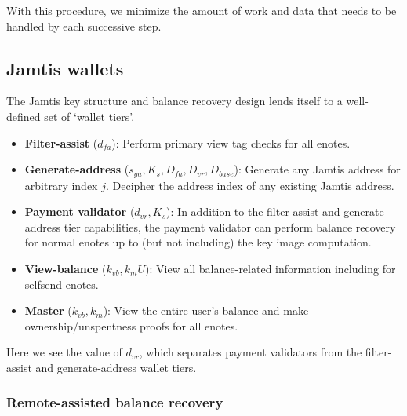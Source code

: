 With this procedure, we minimize the amount of work and data that needs to be handled by each successive step.


\subsection{Jamtis wallets}
\label{subsec:jamtis-wallets}

The Jamtis key structure and balance recovery design lends itself to a well-defined set of `wallet tiers'.

\begin{itemize}
    \item \textbf{Filter-assist} ($d_{fa}$): Perform primary view tag checks for all enotes.

    \item \textbf{Generate-address} ($s_{ga}, K_s, D_{fa}, D_{vr}, D_{base}$): Generate any Jamtis address for arbitrary index $j$. Decipher the address index of any existing Jamtis address.

    \item \textbf{Payment validator} ($d_{vr}, K_s$): In addition to the filter-assist and generate-address tier capabilities, the payment validator can perform balance recovery for normal enotes up to (but not including) the key image computation.

    \item \textbf{View-balance} ($k_{vb}, k_m U$): View all balance-related information including for selfsend enotes.

    \item \textbf{Master} ($k_{vb}, k_m$): View the entire user's balance and make ownership/unspentness proofs for all enotes.
\end{itemize}

Here we see the value of $d_{vr}$, which separates payment validators from the filter-assist and generate-address wallet tiers.

\subsubsection{Remote-assisted balance recovery}
\label{subsubsec:jamtis-wallets-remote-assisted}

